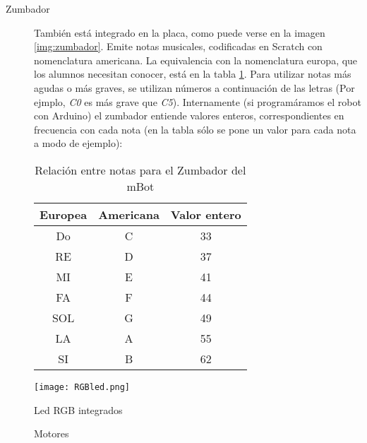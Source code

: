 \begin{description}
	\item [Zumbador] También está integrado en la placa, como puede verse en la imagen \ref{img:zumbador}. Emite notas musicales, codificadas en Scratch con nomenclatura americana. La equivalencia con la nomenclatura europa, que los alumnos necesitan conocer, está en la tabla \ref{table:notasZumbador}. Para utilizar notas más agudas o más graves, se utilizan números a continuación de las letras (Por ejmplo, \textit{C0} es más grave que \textit{C5}). Internamente (si programáramos el robot con Arduino) el zumbador entiende valores enteros, correspondientes en frecuencia con cada nota (en la tabla sólo se pone un valor para cada nota a modo de ejemplo):
	\begin{table}[h]
		\centering
		\begin{tabular}{ c | c | c}	
			Europea & Americana & Valor entero \\
			\hline			
			Do & C & 33\\
			RE & D & 37\\
			MI & E & 41\\
			FA & F & 44\\
			SOL & G & 49\\
			LA & A & 55\\
			SI & B & 62\\
		\end{tabular}
	
	\caption{Relación entre notas para el Zumbador del mBot}
	\label{table:notasZumbador}
	\end{table}	
\end{description}

\begin{figure}[H]
	\texttt{[image: RGBled.png]}
	\centering
	\caption{Led RGB integrados}
	\label{img:led}
\end{figure}

\begin{figure}[H]
	\begin{center}
		\begin{subfigure}
			[Puerto de conexión de los motores]{
				\texttt{[image: puertomotor.png]}
				\label{img:puertomotor}}
		\end{subfigure}
		\begin{subfigure}
			[Motor DC]{			
				\texttt{[image: motorDC2.png]}
				\label{img:motor1}}
		\end{subfigure}
		\begin{subfigure}
			[Motor DC: montaje con rueda]{			
				\texttt{[image: motorDC.png]}
				\label{img:motor2}}
		\end{subfigure}				
		\caption{Motores}
		\label{img:motores}
	\end{center}
\end{figure}

